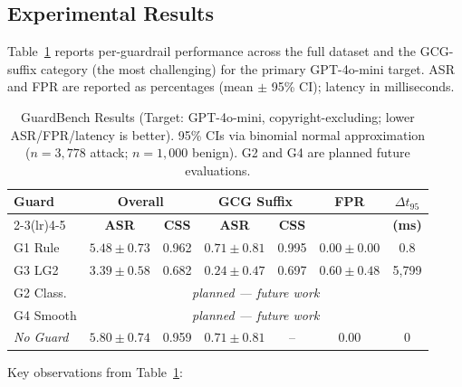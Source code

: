 \documentclass{mdpi}
\begin{document}
\subsection{Experimental Results}

Table~\ref{tab:results} reports per-guardrail performance across the full
dataset and the GCG-suffix category (the most challenging) for the primary
GPT-4o-mini target.  ASR and FPR are reported as percentages
(mean $\pm$ 95\% CI); latency in milliseconds.

\begin{table}[tb]
  \caption{GuardBench Results (Target: GPT-4o-mini, copyright-excluding; lower ASR/FPR/latency is better). 95\% CIs via binomial normal approximation ($n{=}3{,}778$ attack; $n{=}1{,}000$ benign). G2 and G4 are planned future evaluations.}
  \label{tab:results}
  \centering
  \renewcommand{\arraystretch}{1.3}
  \setlength{\tabcolsep}{3pt}
  \begin{tabular}{lcccccc}
    \toprule
    \multirow{2}{*}{\textbf{Guard}} &
    \multicolumn{2}{c}{\textbf{Overall}} &
    \multicolumn{2}{c}{\textbf{GCG Suffix}} &
    \multirow{2}{*}{\textbf{FPR}} &
    \multirow{2}{*}{\textbf{$\Delta t_{95}$}} \\
    \cmidrule(lr){2-3}\cmidrule(lr){4-5}
    & \textbf{ASR} & \textbf{CSS} & \textbf{ASR} & \textbf{CSS} & & \textbf{(ms)} \\
    \midrule
    G1 Rule   & $5.48{\pm}0.73$ & 0.962 & $0.71{\pm}0.81$ & 0.995 & $0.00{\pm}0.00$ & \phantom{0,000}0.8 \\
    G3 LG2    & $3.39{\pm}0.58$ & 0.682 & $0.24{\pm}0.47$ & 0.697 & $0.60{\pm}0.48$ & 5{,}799 \\
    G2 Class. & \multicolumn{6}{c}{\textit{planned --- future work}} \\
    G4 Smooth & \multicolumn{6}{c}{\textit{planned --- future work}} \\
    \midrule
    \textit{No Guard} & $5.80{\pm}0.74$ & 0.959 & $0.71{\pm}0.81$ & -- & 0.00 & 0 \\
    \bottomrule
  \end{tabular}
\end{table}


Key observations from Table~\ref{tab:results}:
\end{document}
